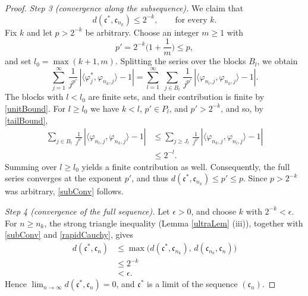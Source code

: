 \documentclass[twoside,11pt,letter]{article}
\def\fc{{\mathfrak{c}}}
\theoremstyle{definition}
\theoremstyle{definition}
\theoremstyle{plain}
\begin{document}
\begin{proof}
\smallskip\noindent\textit{Step 3 (convergence along the subsequence).}
We claim that
\begin{equation}\label{subConv}
d(\fc^\ast,\fc_{n_k})\leq 2^{-k},\qquad\text{for every }k.
\end{equation}
Fix $k$ and let $p>2^{-k}$ be arbitrary. Choose an integer $m\geq1$ with
\begin{equation*}
p'=2^{-k}\Big(1+\frac1m\Big)\leq p,
\end{equation*}
and set $l_0=\max(k+1,m)$. Splitting the series over the blocks $B_l$, we obtain
\begin{equation*}
\sum_{j=1}^\infty\,\frac{1}{j^{p'}}\,|\langle \varphi^\ast_{j},\varphi_{n_k,j}\rangle-1|
=\sum_{l=1}^\infty\;\sum_{j\in B_l}\,\frac{1}{j^{p'}}\,|\langle \varphi_{n_l,j},\varphi_{n_k,j}\rangle-1|.
\end{equation*}
The blocks with $l<l_0$ are finite sets, and their contribution is finite by \eqref{unitBound}. For $l\geq l_0$ we have $k<l$, $p'\in P_l$, and $p'>2^{-k}$, and so, by \eqref{tailBound},
\begin{equation*}
\begin{split}
\sum_{j\in B_l}\,\frac{1}{j^{p'}}\,|\langle \varphi_{n_l,j},\varphi_{n_k,j}\rangle-1|
&\leq\sum_{j\geq J_l}\,\frac{1}{j^{p'}}\,|\langle \varphi_{n_k,j},\varphi_{n_l,j}\rangle-1|\\
&\leq 2^{-l}.
\end{split}
\end{equation*}
Summing over $l\geq l_0$ yields a finite contribution as well. Consequently, the full series converges at the exponent $p'$, and thus $d(\fc^\ast,\fc_{n_k})\leq p'\leq p$. Since $p>2^{-k}$ was arbitrary, \eqref{subConv} follows.

\smallskip\noindent\textit{Step 4 (convergence of the full sequence).}
Let $\epsilon>0$, and choose $k$ with $2^{-k}<\epsilon$. For $n\geq n_k$, the strong triangle inequality (Lemma \ref{ultraLem} (iii)), together with \eqref{subConv} and \eqref{rapidCauchy}, gives
\begin{equation*}
\begin{split}
d(\fc^\ast,\fc_n)&\leq\max\big(d(\fc^\ast,\fc_{n_k}),\,d(\fc_{n_k},\fc_n)\big)\\
&\leq 2^{-k}\\
&<\epsilon.
\end{split}
\end{equation*}
Hence $\lim_{n\to\infty}d(\fc^\ast,\fc_n)=0$, and $\fc^\ast$ is a limit of the sequence $(\fc_n)$.
\end{proof}
\end{document}

